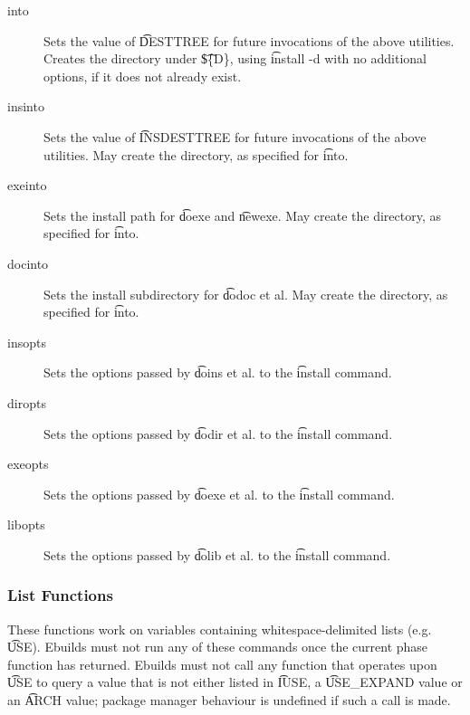 \begin{description}

\item[into] Sets the value of \t{DESTTREE} for future invocations of the above utilities.  Creates
the directory under \t{\$\{D\}}, using \t{install -d} with no additional options, if it does not
already exist.

\item[insinto] Sets the value of \t{INSDESTTREE} for future invocations of the above utilities. May
    create the directory, as specified for \t{into}.

\item[exeinto] Sets the install path for \t{doexe} and \t{newexe}. May create the directory, as specified
    for \t{into}.

\item[docinto] Sets the install subdirectory for \t{dodoc} et al. May create the directory, as specified
    for \t{into}.

\item[insopts] Sets the options passed by \t{doins} et al. to the \t{install} command.

\item[diropts] Sets the options passed by \t{dodir} et al. to the \t{install} command.

\item[exeopts] Sets the options passed by \t{doexe} et al. to the \t{install} command.

\item[libopts] Sets the options passed by \t{dolib} et al. to the \t{install} command.

\end{description}

\subsubsection{List Functions}
These functions work on variables containing whitespace-delimited lists (e.g. \t{USE}). Ebuilds must
not run any of these commands once the current phase function has returned. Ebuilds must not call
any function that operates upon \t{USE} to query a value that is not either listed in \t{IUSE}, a
\t{USE\_EXPAND} value or an \t{ARCH} value; package manager behaviour is undefined if such a call
is made.


